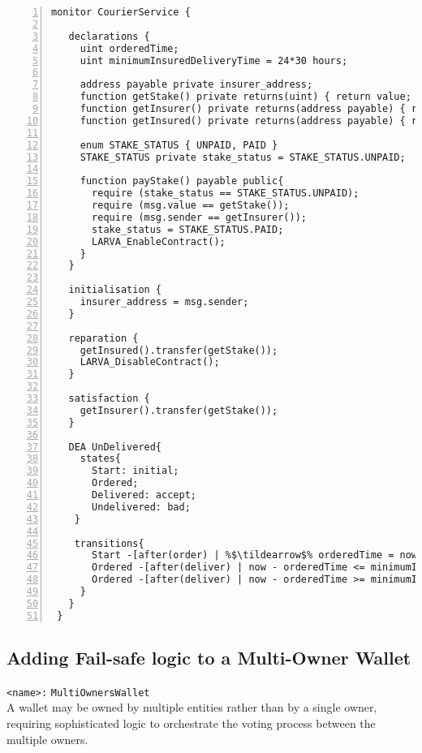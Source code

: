 \documentclass{article}
\newcommand{\tildearrow}{{\raise.37ex\hbox{$\scriptstyle\mathtt{\sim}$}}\hspace{-0.08cm}>\xspace}
\begin{document}
  \small\begin{lstlisting}[language=DEA,basicstyle=\scriptsize,numbers=left,numbersep=2pt,xleftmargin=0.3cm,escapechar=\%,label={dea:insurancecourier},caption={Monitor that implements state-based insurance logic.}]
 monitor CourierService {
 
   declarations {
     uint orderedTime;
     uint minimumInsuredDeliveryTime = 24*30 hours;
 
     address payable private insurer_address;
     function getStake() private returns(uint) { return value; }
     function getInsurer() private returns(address payable) { return insurer_address; }
     function getInsured() private returns(address payable) { return customer; }
 
     enum STAKE_STATUS { UNPAID, PAID }
     STAKE_STATUS private stake_status = STAKE_STATUS.UNPAID;
 
     function payStake() payable public{
       require (stake_status == STAKE_STATUS.UNPAID);
       require (msg.value == getStake());
       require (msg.sender == getInsurer());
       stake_status = STAKE_STATUS.PAID;
       LARVA_EnableContract();
     }
   }
 
   initialisation {
     insurer_address = msg.sender;
   }
 
   reparation {
     getInsured().transfer(getStake());
     LARVA_DisableContract();
   }
 
   satisfaction {
     getInsurer().transfer(getStake());
   }
 
   DEA UnDelivered{
     states{
       Start: initial;
       Ordered;
       Delivered: accept;
       Undelivered: bad;
    }
 
    transitions{
       Start -[after(order) | %$\tildearrow$% orderedTime = now;]-> Ordered;
       Ordered -[after(deliver) | now - orderedTime <= minimumInsuredDeliveryTime]-> Delivered;
       Ordered -[after(deliver) | now - orderedTime >= minimumInsuredDeliveryTime]-> Undelivered;
     }
   }
 }
 \end{lstlisting}\normalsize
 
 
 \subsection{Adding Fail-safe logic to a Multi-Owner Wallet} 
         \texttt{<name>:} \verb+MultiOwnersWallet+\\

A wallet may be owned by multiple entities rather than by a single owner, requiring sophisticated logic to orchestrate the voting process between the multiple owners.
\end{document}
